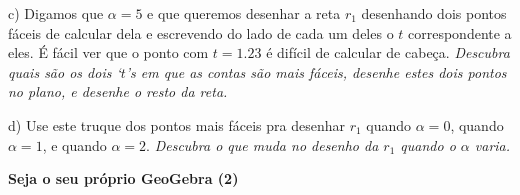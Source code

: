 \documentclass[oneside,12pt]{article}
\begin{document}
{{    \bsk

    c) Digamos que $α=5$ e que queremos desenhar a reta $r_1$
    desenhando dois pontos fáceis de calcular dela e escrevendo do
    lado de cada um deles o $t$ correspondente a eles. É fácil ver que
    o ponto com $t=1.23$ é difícil de calcular de cabeça. {\sl
      Descubra quais são os dois `$t$'s em que as contas são mais
      fáceis, desenhe estes dois pontos no plano, e desenhe o resto da
      reta.}

    \msk

    d) Use este truque dos pontos mais fáceis pra desenhar $r_1$
    quando $α=0$, quando $α=1$, e quando $α=2$. {\sl Descubra o que
      muda no desenho da $r_1$ quando o $α$ varia.}


}}

\newpage


{\bf Seja o seu próprio GeoGebra (2)}
\end{document}
